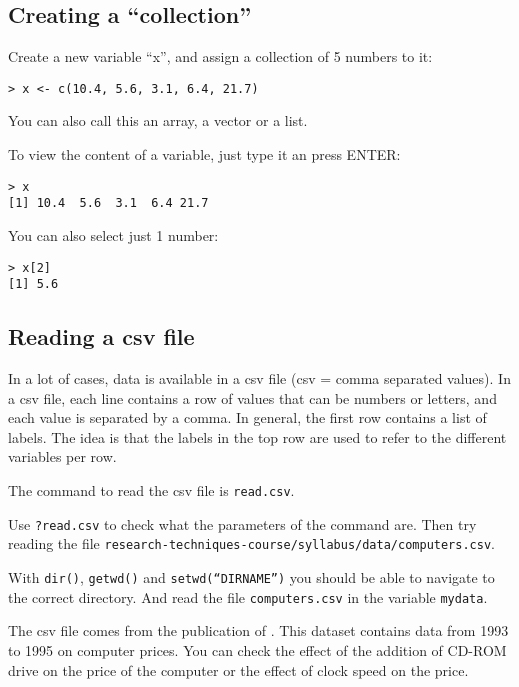 \subsection{Creating a ``collection''}

Create a new variable ``x'', and assign a collection of 5 numbers to it:
\begin{lstlisting}
> x <- c(10.4, 5.6, 3.1, 6.4, 21.7)
\end{lstlisting}
You can also call this an array, a vector or a list.

To view the content of a variable, just type it an press ENTER:
\begin{lstlisting}
> x
[1] 10.4  5.6  3.1  6.4 21.7
\end{lstlisting}

You can also select just 1 number:
\begin{lstlisting}
> x[2]
[1] 5.6
\end{lstlisting}

\subsection{Reading a csv file}

In a lot of cases, data is available in a csv file (csv = comma separated values). In a csv file, each line contains a row of values that can be numbers or letters, and each value is separated by a comma. In general, the first row contains a list of labels. The idea is that the labels in the top row are used to refer to the different variables per row.

The command to read the csv file is \texttt{read.csv}.

\begin{exercise}
    Use \texttt{?read.csv} to check what the parameters of the command are. Then try reading the file \texttt{research-techniques-course/syllabus/data/computers.csv}.
\end{exercise}

With \texttt{dir()}, \texttt{getwd()} and \texttt{setwd(``DIRNAME'')} you should be able to navigate to the correct directory. And read the file \texttt{computers.csv} in the variable \texttt{mydata}.

The csv file comes from the publication of \autocite{Stengos2005}. This dataset contains data from 1993 to 1995 on computer prices. You can check the effect of the addition of CD-ROM drive on the price of the computer or the effect of clock speed on the price.

